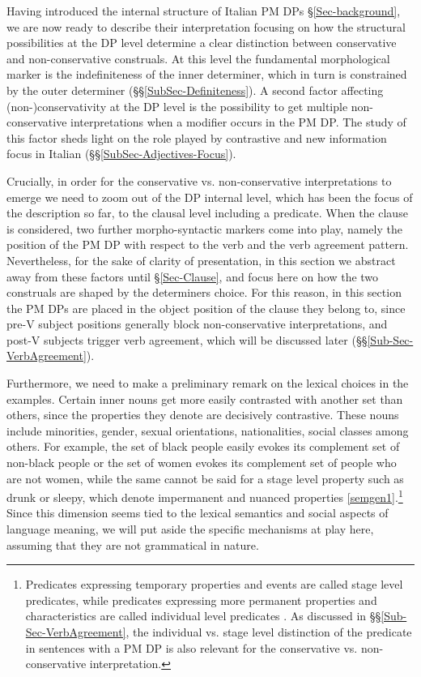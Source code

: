 \documentclass[charis, linguex]{glossa}
\begin{document}
Having introduced the internal structure of Italian PM DPs \S\ref{Sec-background}, we are now ready to describe their interpretation focusing on how the structural possibilities at the DP level determine a clear distinction between conservative and non-conservative construals. At this level the fundamental morphological marker is the indefiniteness of the inner determiner, which in turn is constrained by the outer determiner (\S\S\ref{SubSec-Definiteness}). A second factor affecting (non-)conservativity at the DP level is the possibility to get multiple non-conservative interpretations when a modifier occurs in the PM DP. The study of this factor sheds light on the role played by contrastive and new information focus in Italian (\S\S\ref{SubSec-Adjectives-Focus}).

Crucially, in order for the conservative vs. non-conservative interpretations to emerge we need to zoom out of the DP internal level, which has been the focus of the description so far, to the clausal level including a predicate. When the clause is considered, two further morpho-syntactic markers come into play, namely the position of the PM DP with respect to the verb and the verb agreement pattern. Nevertheless, for the sake of clarity of presentation, in this section we abstract away from these factors until \S\ref{Sec-Clause}, and focus here on how the two construals are shaped by the determiners choice. For this reason, in this section the PM DPs are placed in the object position of the clause they belong to, since pre-V subject positions generally block non-conservative interpretations, and post-V subjects trigger verb agreement, which will be discussed later (\S\S\ref{Sub-Sec-VerbAgreement}). 

Furthermore, we need to make a preliminary remark on the lexical choices in the
examples. Certain inner nouns get more easily contrasted with another set than
others, since the properties they denote are decisively contrastive. These
nouns include minorities, gender, sexual orientations, nationalities, social
classes among others. For example, the set of black people easily evokes its
complement set of non-black people or the set of women evokes its complement
set of people who are not women, while the same cannot be said for a stage
level property such as drunk or sleepy, which denote impermanent and nuanced
properties \ref{semgen1}.\footnote{\label{footnote22}Predicates expressing temporary properties
and events are called stage level predicates, while predicates expressing more
permanent properties and characteristics are called individual level predicates \citep{mil74,car77a}. As discussed in
\S\S\ref{Sub-Sec-VerbAgreement}, the individual vs. stage level distinction of
the predicate in sentences with a PM DP is also relevant for the conservative
vs. non-conservative interpretation.} Since this dimension seems tied to the
lexical semantics and social aspects of language meaning, we will put aside the
specific mechanisms at play here, assuming that they are not grammatical in
nature.
\end{document}
